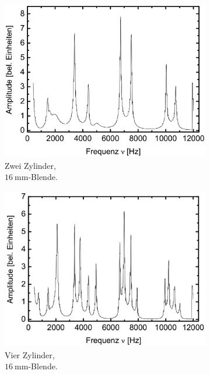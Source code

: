 \begin{figure}
\begin{subfigure}{0.3\textwidth}
    \includegraphics[width=\textwidth]{korrektur/2_50mm_16.png}
    \caption{Zwei Zylinder,\\$\SI{16}{\milli\meter}$-Blende.}
  \end{subfigure}
  \begin{subfigure}{0.3\textwidth}
    \centering
    \includegraphics[width=\textwidth]{korrektur/4_50mm_16.png}
    \caption{Vier Zylinder,\\$\SI{16}{\milli\meter}$-Blende.}
  \end{subfigure}
  \begin{subfigure}{0.3\textwidth}
    \centering

\end{subfigure}
\end{figure}
